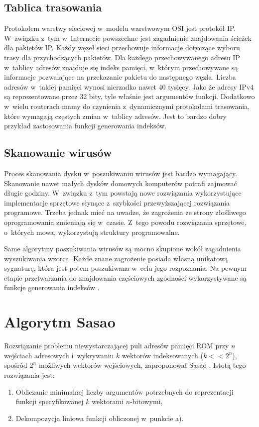 \subsection{Tablica trasowania}
Protokołem warstwy sieciowej w~modelu warstwowym OSI jest protokół IP.
W~związku z~tym w~Internecie powszechne jest zagadnienie znajdowania ścieżek dla pakietów IP.
Każdy węzeł sieci przechowuje informacje dotyczące wyboru trasy dla przychodzących pakietów.
Dla każdego przechowywanego adresu IP w~tablicy adresów znajduje się indeks pamięci,
w~którym przechowywane są informacje pozwalające na przekazanie pakietu do następnego węzła.
Liczba adresów w~takiej pamięci wynosi nierzadko nawet 40 tysięcy.
Jako że adresy IPv4 są reprezentowane przez 32 bity, tyle właśnie jest argumentów funkcji.
Dodatkowo w~wielu routerach mamy do czynienia z~dynamicznymi protokołami trasowania,
które wymagają częstych zmian w~tablicy adresów.
Jest to bardzo dobry przykład zastosowania funkcji generowania indeksów.

\subsection{Skanowanie wirusów}
Proces skanowania dysku w~poszukiwaniu wirusów jest bardzo wymagający.
Skanowanie nawet małych dysków domowych komputerów potrafi zajmować długie godziny.
W~związku z~tym powstają nowe rozwiązania wykorzystujące implementacje sprzętowe słynące z~szybkości przewyższającej rozwiązania programowe.
Trzeba jednak mieć na uwadze, że zagrożenia ze strony złośliwego oprogramowania zmieniają się w~czasie.
Z~tego powodu rozwiązania sprzętowe, o~których mowa, wykorzystują struktury programowalne.

Same algorytmy poszukiwania wirusów są mocno skupione wokół zagadnienia wyszukiwania wzorca.
Każde znane zagrożenie posiada własną unikatową sygnaturę,
która jest potem poszukiwana w~celu jego rozpoznania.
Na pewnym etapie przetwarzania do znajdowania częściowych zgodności wykorzystywane są funkcje generowania indeksów \cite{wirusy}.

\section{Algorytm Sasao}
Rozwiązanie problemu niewystarczającej puli adresów pamięci ROM przy $n$ wejściach adresowych i~wykrywaniu $k$ wektorów indeksowanych ($k<<2^n$),
spośród $2^n$ możliwych wektorów wejściowych,
zaproponował Sasao \cite{sasao-workshop, sasao-recent, sasao-s-min, sasao-synthesis}.
Istotą tego rozwiązania jest:
\begin{enumerate}[label=\alph*)]
\item Obliczanie minimalnej liczby argumentów potrzebnych do reprezentacji funkcji specyfikowanej $k$ wektorami $n$-bitowymi,
\item Dekompozycja liniowa funkcji obliczonej w~punkcie a).
\end{enumerate}

